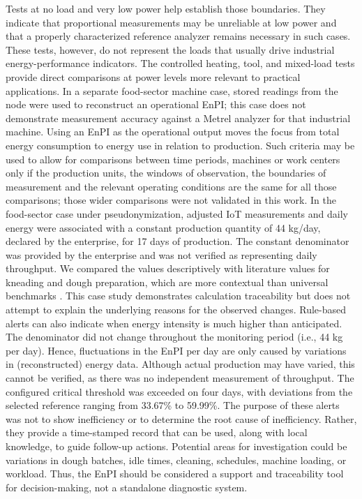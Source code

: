 \documentclass[technologies,article,submit,pdftex,moreauthors]{Definitions/mdpi}
\begin{document}
Tests at no load and very low power help establish those boundaries. They indicate that proportional measurements may be unreliable at low power and that a properly characterized reference analyzer remains necessary in such cases. These tests, however, do not represent the loads that usually drive industrial energy-performance indicators. The controlled heating, tool, and mixed-load tests provide direct comparisons at power levels more relevant to practical applications. In a separate food-sector machine case, stored readings from the node were used to reconstruct an operational EnPI; this case does not demonstrate measurement accuracy against a Metrel analyzer for that industrial machine.
Using an EnPI as the operational output moves the focus from total energy consumption to energy use in relation to production. Such criteria may be used to allow for comparisons between time periods, machines or work centers only if the production units, the windows of observation, the boundaries of measurement and the relevant operating conditions are the same for all those comparisons; those wider comparisons were not validated in this work. In the food-sector case under pseudonymization, adjusted IoT measurements and daily energy were associated with a constant production quantity of 44 kg/day, declared by the enterprise, for 17 days of production. The constant denominator was provided by the enterprise and was not verified as representing daily throughput. 
We compared the values descriptively with literature values for kneading and dough preparation, which are more contextual than universal benchmarks \cite{ref22,ref23}.
This case study demonstrates calculation traceability but does not attempt to explain the underlying reasons for the observed changes. Rule-based alerts can also indicate when energy intensity is much higher than anticipated. The denominator did not change throughout the monitoring period (i.e., 44 kg per day). Hence, fluctuations in the EnPI per day are only caused by variations in (reconstructed) energy data. Although actual production may have varied, this cannot be verified, as there was no independent measurement of throughput. The configured critical threshold was exceeded on four days, with deviations from the selected reference ranging from 33.67\% to 59.99\%. The purpose of these alerts was not to show inefficiency or to determine the root cause of inefficiency. Rather, they provide a time-stamped record that can be used, along with local knowledge, to guide follow-up actions. Potential areas for investigation could be variations in dough batches, idle times, cleaning, schedules, machine loading, or workload. Thus, the EnPI should be considered a support and traceability tool for decision-making, not a standalone diagnostic system. 
\end{document}
